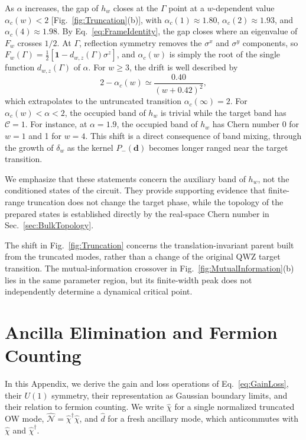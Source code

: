\documentclass[aps,prb,10pt,twocolumn,superscriptaddress,longbibliography,floatfix]{revtex4-2}
\newcommand{\mc}[1]{\mathcal{#1}}
\newcommand{\Id}{\mathbf{1}}
\newcommand{\newtext}[1]{{\color{blue}#1}}
\newcommand{\claudeadd}[1]{{\color{orange}#1}}
\begin{document}
As $\alpha$ increases, the gap of $h_w$ closes at the $\Gamma$ point at a $w$-dependent value $\alpha_c(w)<2$ [Fig.~\ref{fig:Truncation}(b)], with $\alpha_c(1)\approx1.80$, $\alpha_c(2)\approx1.93$, and $\alpha_c(4)\approx1.98$. \claudeadd{By Eq.~\eqref{eq:FrameIdentity}, the gap closes where an eigenvalue of $F_w$ crosses $1/2$. At $\Gamma$, reflection symmetry removes the $\sigma^x$ and $\sigma^y$ components, so $F_w(\Gamma)=\frac12[\Id-d_{w,z}(\Gamma)\sigma^z]$, and $\alpha_c(w)$ is simply the root of the single function $d_{w,z}(\Gamma)$ of $\alpha$.} For $w\geq3$, the drift is well described by
\begin{equation}
    2-\alpha_c(w)\simeq\frac{0.40}{(w+0.42)^2},
    \label{eq:CriticalDrift}
\end{equation}
which extrapolates to the untruncated transition $\alpha_c(\infty)=2$. For $\alpha_c(w)<\alpha<2$, the occupied band of $h_w$ is trivial while the target band has $\mc C=1$. For instance, at $\alpha=1.9$, the occupied band of $h_w$ has Chern number 0 for $w=1$ and 1 for $w=4$. This shift is a direct consequence of band mixing\claudeadd{, through the growth of $\delta_w$ as the kernel $P_-(\boldsymbol d)$ becomes longer ranged near the target transition}.

\claudeadd{We emphasize that these statements concern the auxiliary band of $h_w$, not the conditioned states of the circuit. They provide supporting evidence that finite-range truncation does not change the target phase, while the topology of the prepared states is established directly by the real-space Chern number in Sec.~\ref{sec:BulkTopology}.}

{\color{blue}
The shift in Fig.~\ref{fig:Truncation} concerns the translation-invariant parent built from the truncated modes, rather than a change of the original QWZ target transition. The mutual-information crossover in Fig.~\ref{fig:MutualInformation}(b) lies in the same parameter region, but its finite-width peak does not independently determine a dynamical critical point.
}

\FloatBarrier
\section{Ancilla Elimination and Fermion Counting}
\label{app:FermionCounting}

In this Appendix, we derive the gain and loss operations of Eq.~\eqref{eq:GainLoss}, their $U(1)$ symmetry, \newtext{their representation as Gaussian boundary limits,} and their relation to fermion counting. We write $\hat\chi$ for a single normalized truncated OW mode, $\hat{\mc N}=\hat\chi^\dagger\hat\chi$, and $\hat d$ for a fresh ancillary mode, which anticommutes with $\hat\chi$ and $\hat\chi^\dagger$.
\end{document}
